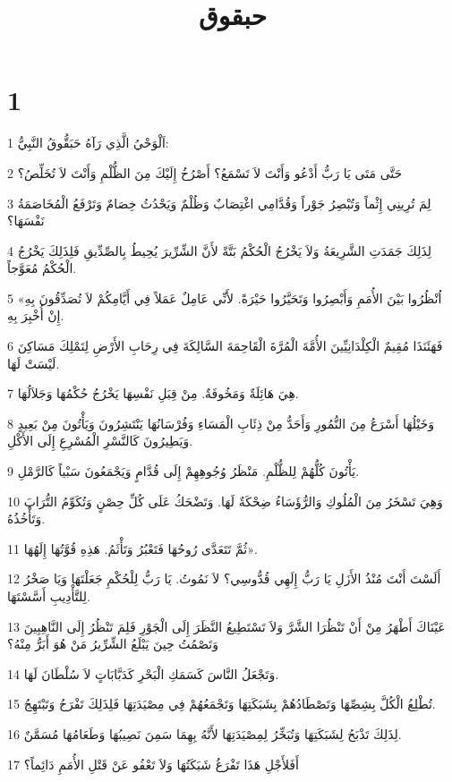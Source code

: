 

\title{حبقوق}


\chapter{1}

\par 1 اَلْوَحْيُ الَّذِي رَآهُ حَبَقُّوقُ النَّبِيُّ:
\par 2 حَتَّى مَتَى يَا رَبُّ أَدْعُو وَأَنْتَ لاَ تَسْمَعُ؟ أَصْرُخُ إِلَيْكَ مِنَ الظُّلْمِ وَأَنْتَ لاَ تُخَلِّصُ؟
\par 3 لِمَ تُرِينِي إِثْماً وَتُبْصِرُ جَوْراً وَقُدَّامِي اغْتِصَابٌ وَظُلْمٌ وَيَحْدُثُ خِصَامٌ وَتَرْفَعُ الْمُخَاصَمَةُ نَفْسَهَا؟
\par 4 لِذَلِكَ جَمَدَتِ الشَّرِيعَةُ وَلاَ يَخْرُجُ الْحُكْمُ بَتَّةً لأَنَّ الشِّرِّيرَ يُحِيطُ بِالصِّدِّيقِ فَلِذَلِكَ يَخْرُجُ الْحُكْمُ مُعَوَّجاً.
\par 5 «اُنْظُرُوا بَيْنَ الأُمَمِ وَأَبْصِرُوا وَتَحَيَّرُوا حَيْرَةً. لأَنِّي عَامِلٌ عَمَلاً فِي أَيَّامِكُمْ لاَ تُصَدِّقُونَ بِهِ إِنْ أُخْبِرَ بِهِ.
\par 6 فَهَئَنَذَا مُقِيمٌ الْكِلْدَانِيِّينَ الأُمَّةَ الْمُرَّةَ الْقَاحِمَةَ السَّالِكَةَ فِي رِحَابِ الأَرْضِ لِتَمْلِكَ مَسَاكِنَ لَيْسَتْ لَهَا.
\par 7 هِيَ هَائِلَةٌ وَمَخُوفَةٌ. مِنْ قِبَلِ نَفْسِهَا يَخْرُجُ حُكْمُهَا وَجَلاَلُهَا.
\par 8 وَخَيْلُهَا أَسْرَعُ مِنَ النُّمُورِ وَأَحَدُّ مِنْ ذِئَابِ الْمَسَاءِ وَفُرْسَانُهَا يَنْتَشِرُونَ وَيَأْتُونَ مِنْ بَعِيدٍ وَيَطِيرُونَ كَالنَّسْرِ الْمُسْرِعِ إِلَى الأَكْلِ.
\par 9 يَأْتُونَ كُلُّهُمْ لِلظُّلْمِ. مَنْظَرُ وُجُوهِهِمْ إِلَى قُدَّامٍ وَيَجْمَعُونَ سَبْياً كَالرَّمْلِ.
\par 10 وَهِيَ تَسْخَرُ مِنَ الْمُلُوكِ وَالرُّؤَسَاءُ ضِحْكَةٌ لَهَا. وَتَضْحَكُ عَلَى كُلِّ حِصْنٍ وَتُكَوِّمُ التُّرَابَ وَتَأْخُذُهُ.
\par 11 ثُمَّ تَتَعَدَّى رُوحُهَا فَتَعْبُرُ وَتَأْثَمُ. هَذِهِ قُوَّتُهَا إِلَهُهَا».
\par 12 أَلَسْتَ أَنْتَ مُنْذُ الأَزَلِ يَا رَبُّ إِلَهِي قُدُّوسِي؟ لاَ نَمُوتُ. يَا رَبُّ لِلْحُكْمِ جَعَلْتَهَا وَيَا صَخْرُ لِلتَّأْدِيبِ أَسَّسْتَهَا.
\par 13 عَيْنَاكَ أَطْهَرُ مِنْ أَنْ تَنْظُرَا الشَّرَّ وَلاَ تَسْتَطِيعُ النَّظَرَ إِلَى الْجَوْرِ فَلِمَ تَنْظُرُ إِلَى النَّاهِبِينَ وَتَصْمُتُ حِينَ يَبْلَعُ الشِّرِّيرُ مَنْ هُوَ أَبَرُّ مِنْهُ؟
\par 14 وَتَجْعَلُ النَّاسَ كَسَمَكِ الْبَحْرِ كَدَبَّابَاتٍ لاَ سُلْطَانَ لَهَا.
\par 15 تُطْلِعُ الْكُلَّ بِشِصِّهَا وَتَصْطَادُهُمْ بِشَبَكَتِهَا وَتَجْمَعُهُمْ فِي مِصْيَدَتِهَا فَلِذَلِكَ تَفْرَحُ وَتَبْتَهِجُ.
\par 16 لِذَلِكَ تَذْبَحُ لِشَبَكَتِهَا وَتُبَخِّرُ لِمِصْيَدَتِهَا لأَنَّهُ بِهِمَا سَمِنَ نَصِيبُهَا وَطَعَامُهَا مُسَمَّنٌ.
\par 17 أَفَلأَجْلِ هَذَا تَفْرَغُ شَبَكَتُهَا وَلاَ تَعْفُو عَنْ قَتْلِ الأُمَمِ دَائِماً؟

